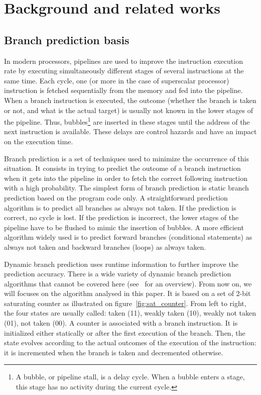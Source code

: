 \section{Background and related works}
\label{sec:relatedworks}

\subsection{Branch prediction basis}
\label{sec:bpbasis}

In modern processors, pipelines are used to improve the instruction execution rate by executing simultaneously different stages of several instructions at the same time.
Each cycle, one (or more in the case of superscalar processor) instruction is fetched sequentially from the memory and fed into the pipeline.
When a branch instruction is executed, the outcome (whether the branch is taken or not, and what is the actual target) is usually not known in the lower stages of the pipeline.
Thus, bubbles\footnote{A bubble, or pipeline stall, is a delay cycle. When a bubble enters a stage, this stage has no activity during the current cycle.} are inserted in these stages until the address of the next instruction is available. These delays are control hazards and have an impact on the execution time.

Branch prediction is a set of techniques used to minimize the occurrence of this situation.
It consists in trying to predict the outcome of a branch instruction when it gets into the pipeline in order to fetch  the correct following instruction with a high probability.
The simplest form of branch prediction is static branch prediction based on the program code only.
A straightforward prediction algorithm is to predict all branches as always not taken.
If the prediction is correct, no cycle is lost.
If the prediction is incorrect, the lower stages of the pipeline have to be flushed to mimic the insertion of bubbles.
A more efficient algorithm widely used is to predict forward branches (conditional statements) as always not taken and backward branches (loops) as always taken.

Dynamic branch prediction uses runtime information to further improve the prediction accuracy.
There is a wide variety of dynamic branch prediction algorithms that cannot be covered here (see~\cite{Engblom2003} for an overview).
From now on, we will focuses on the algorithm analysed in this paper.
It is based on a set of 2-bit saturating counter as illustrated on figure~\ref{fig:sat_counter}.
From left to right, the four states are usually called: taken (11), weakly taken (10), weakly not taken (01), not taken (00).
A counter is associated with a branch instruction.
It is initialized either statically or after the first execution of the branch.
Then, the state evolves according to the actual outcomes of the execution of the instruction: it is incremented when the branch is taken and decremented otherwise.

